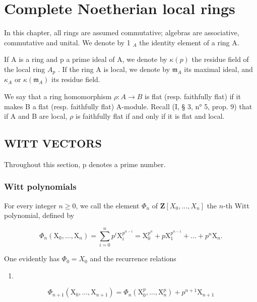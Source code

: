 \chapter{Complete Noetherian local rings}

In this chapter, all rings are assumed commutative; algebras are associative, commutative and unital. We denote by 1 \(_{A}\) the identity element of a ring A.

If A is a ring and p a prime ideal of A, we denote by \(\kappa(p)\) the residue field of the local ring \(A_p\) . If the ring A is local, we denote by \(\mathfrak{m}_A\) its maximal ideal, and \(\kappa_A\) or \(\kappa(\mathfrak{m}_A)\) its residue field.

We say that a ring homomorphism \(\rho: A \to B\) is flat (resp. faithfully flat) if it makes B a flat (resp. faithfully flat) A-module. Recall (I, § 3, n° 5, prop. 9) that if A and B are local, \(\rho\) is faithfully flat if and only if it is flat and local.

\section{WITT VECTORS}

Throughout this section, p denotes a prime number.

\subsection{Witt polynomials}

For every integer \(n \geqslant 0\), we call the element \(\Phi_n\) of \(\mathbf{Z}[X_0, ..., X_n]\) the \(n\)-th Witt polynomial, defined by

\[
\Phi_ {n} \left(\mathrm{X} _ {0}, \dots , \mathrm{X} _ {n}\right) = \sum_ {i = 0} ^ {n} p ^ {i} \mathrm{X} _ {i} ^ {p ^ {n - i}} = \mathrm{X} _ {0} ^ {p ^ {n}} + p \mathrm{X} _ {1} ^ {p ^ {n - 1}} + \dots + p ^ {n} \mathrm{X} _ {n}.\tag{1}
\]

One evidently has \(\Phi_{0}=X_{0}\) and the recurrence relations

\begin{enumerate}
\def\labelenumi{(\arabic{enumi})}
\setcounter{enumi}{1}
\tightlist
\item
\end{enumerate}

\[
\Phi_ {n + 1} \left(\mathrm{X} _ {0}, \dots , \mathrm{X} _ {n + 1}\right) = \Phi_ {n} \left(\mathrm{X} _ {0} ^ {p}, \dots , \mathrm{X} _ {n} ^ {p}\right) + p ^ {n + 1} \mathrm{X} _ {n + 1}\tag{3}
\]

